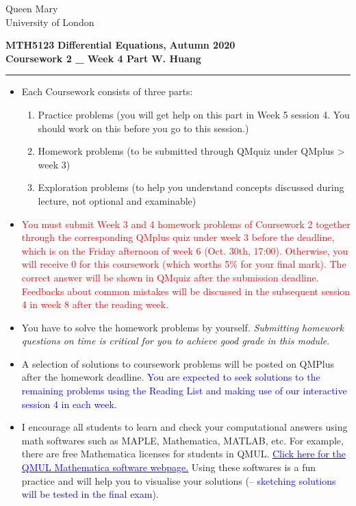 \documentclass[11pt,a4paper,twoside]{article}
\begin{document}
	\begin{singlespace}
		\begin{center}
			\Huge Queen Mary\\
			\LARGE University of London
		\end{center}
		\Large \textbf{MTH5123} \hfill \Large \textbf{Differential Equations,} \hfill \Large \textbf{Autumn 2020}\\
		\large \textbf{Coursework 2 \_ Week 4 Part} \hfill \large \textbf{W. Huang}
    \rule{\textwidth}{0.4pt}
	\end{singlespace}
	\begin{itemize}
		\item Each Coursework consists of three parts:
		\begin{enumerate}[\bfseries I.]
			\item Practice problems (you will get help on this part in Week 5 session 4. You should work on this before you go to this session.)
			\item Homework problems (to be submitted through QMquiz under QMplus > week 3)
			\item Exploration problems (to help you understand concepts discussed during lecture, not optional and examinable)
		\end{enumerate}
		\item \textcolor{red}{You must submit Week 3 and 4 homework problems of Coursework 2 together through the corresponding QMplus quiz under week 3 before the deadline, which is on the Friday afternoon of week 6 (Oct. 30th, 17:00). Otherwise, you will receive
		0 for this coursework (which worths 5\% for your final mark). The correct answer will be shown in QMquiz after the submission deadline. Feedbacks about common mistakes will be discussed in the subsequent session 4 in week 8 after the reading week.}
		\item You have to solve the homework problems by yourself. \textit{Submitting homework questions on time is critical for you to achieve good grade in this module}.
		\item A selection of solutions to coursework problems will be posted on QMPlus after the homework deadline. \textcolor{blue}{You are expected to seek solutions to the remaining problems using the Reading List and making use of our interactive session 4 in each week.}
		\item I encourage all students to learn and check your computational answers using math softwares such as MAPLE, Mathematica, MATLAB, etc. For example, there are free Mathematica licenses for students in QMUL. \href{https://www.its.qmul.ac.uk/services/service-catalogue/items/software---computational-mathematica.html}{\textcolor{blue}{Click here for the QMUL Mathematica software webpage.}} Using these softwares is a fun practice and will help you to visualise your solutions (– \textcolor{blue}{sketching solutions will be tested in the final exam}).
	\end{itemize}
\end{document}
